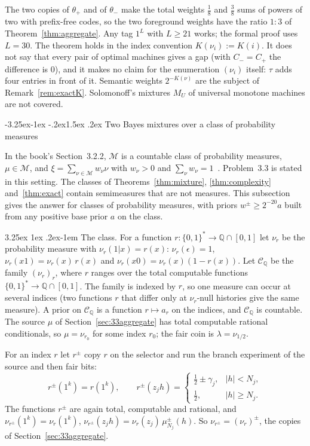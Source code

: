 \documentclass[11pt]{article}
\makeatletter
\renewcommand\subsection{\@startsection{subsection}{2}{\z@}%
  {-3.25ex\@plus -1ex \@minus -.2ex}{1.5ex \@plus .2ex}%
  {\normalfont\large\bfseries\boldmath}}
\renewcommand\paragraph{\@startsection{paragraph}{4}{\z@}%
  {3.25ex \@plus1ex \@minus.2ex}{-1em}%
  {\normalfont\normalsize\bfseries\boldmath}}
\newcommand{\Bs}{\{0,1\}^*}
\newcommand{\eps}{\epsilon}
\newcommand{\cM}{\mathcal{M}}
\newcommand{\cCQ}{\mathcal{C}_{\mathbb{Q}}}
\theoremstyle{definition}
\theoremstyle{remark}
\makeatother
\begin{document}
The two copies of $\theta_+$ and of $\theta_-$ make the total weights
$\frac18$ and $\frac38$ sums of powers of two with prefix-free codes, so the
two foreground weights have the ratio $1:3$ of Theorem~\ref{thm:aggregate}.
Any tag $1^L$ with $L\ge21$ works; the formal proof uses $L=30$. The theorem
holds in the index convention $K(\nu_i):=K(i)$. It does not say that every
pair of optimal machines gives a gap (with $C_-=C_+$ the difference is $0$),
and it makes no claim for the enumeration $(\nu_i)$ itself: $\tau$ adds four
entries in front of it. Semantic weights $2^{-K(\nu)}$ are the subject of
Remark~\ref{rem:exactK}. Solomonoff's mixtures $M_U$ of universal monotone
machines are not covered.

\subsection{Two Bayes mixtures over a class of probability measures}\label{sec:33measures}

In the book's Section~3.2.2, $\cM$ is a countable class of probability
measures, $\mu\in\cM$, and $\xi=\sum_{\nu\in\cM}w_\nu\nu$ with $w_\nu>0$ and
$\sum_\nu w_\nu=1$~\cite[p.~70, eq.~(3.5)]{hutter2005uai}. Problem~3.3 is
stated in this setting. The classes of Theorems~\ref{thm:mixture},
\ref{thm:complexity} and~\ref{thm:exact} contain semimeasures that are not measures. This
subsection gives the answer for classes of probability measures, with priors
$w^\pm\ge2^{-20}a$ built from any positive base prior $a$ on the class.

\paragraph{The class.}
For a function $r:\Bs\to\mathbb Q\cap[0,1]$ let $\nu_r$ be the probability
measure with $\nu_r(1|x)=r(x)$: $\nu_r(\eps)=1$, $\nu_r(x1)=\nu_r(x)\,r(x)$
and $\nu_r(x0)=\nu_r(x)(1-r(x))$. Let $\cCQ$ be the family $(\nu_r)_r$, where
$r$ ranges over the total computable functions $\Bs\to\mathbb Q\cap[0,1]$. The
family is indexed by $r$, so one measure can occur at several indices (two
functions $r$ that differ only at $\nu_r$-null histories give the same
measure). A prior on $\cCQ$ is a function $r\mapsto a_r$ on the indices, and
$\cCQ$ is countable. The source $\mu$ of Section~\ref{sec:33aggregate} has total computable
rational conditionals, so $\mu=\nu_{r_0}$ for some index $r_0$; the fair
coin is $\lambda=\nu_{1/2}$.

For an index $r$ let $r^\pm$ copy $r$ on the selector and run the branch
experiment of the source and then fair bits:
\[
r^\pm(1^k)=r(1^k),\qquad
r^\pm(z_jh)=\begin{cases}\frac12\pm\gamma_j,&|h|<N_j,\\[2pt] \frac12,&|h|\ge N_j.\end{cases}
\]
The functions $r^\pm$ are again total, computable and rational, and
$\nu_{r^\pm}(1^k)=\nu_r(1^k)$, $\nu_{r^\pm}(z_jh)=\nu_r(z_j)\,\mu^\pm_{N_j}(h)$. So
$\nu_{r^\pm}=(\nu_r)^\pm$, the copies of Section~\ref{sec:33aggregate}.
\end{document}
